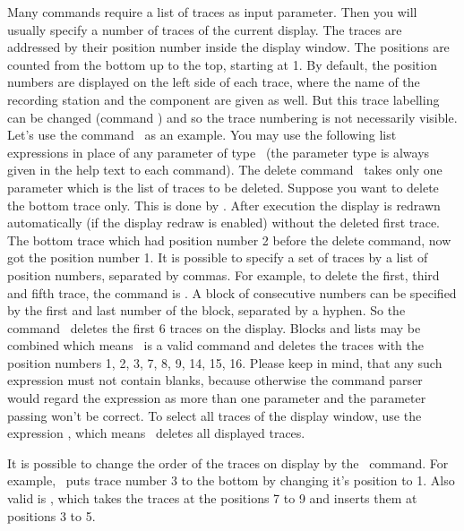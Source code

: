 Many commands require a list of traces as input parameter.  Then
you will usually specify a number of traces of the current display.
The traces are addressed by their position number inside the
display window.  The positions are counted from the bottom up to
the top, starting at 1.  By default, the position numbers are
displayed on the left side of each trace, where the name of the
recording station and the component are given as well.  But this
trace labelling can be changed (command ) and so the
trace numbering is not necessarily visible.  Let's use the
command \ as an example.  You may use the following
list expressions in place of any parameter of type \
(the parameter type is always given in the help text to each
command).  The delete command \ takes only one parameter
which is the list of traces to be deleted.  Suppose you want to
delete the bottom trace only.  This is done by .  After
execution the display is redrawn automatically (if the display
redraw is enabled) without the deleted first trace.  The bottom
trace which had position number 2 before the delete command, now
got the position number 1.  It is possible to specify a set of
traces by a list of position numbers, separated by commas.  For
example, to delete the first, third and fifth trace, the command
is \cmd{del 1,3,5}.  A block of consecutive numbers can be specified
by the first and last number of the block, separated by a hyphen.
So the command \cmd{del 1-6}\ deletes the first 6 traces on the
display.  Blocks and lists may be combined which means \ is a valid command and deletes the traces with
the position numbers 1, 2, 3, 7, 8, 9, 14, 15, 16.  Please keep
in mind, that any such expression must not contain blanks, because
otherwise the command parser would regard the expression as more
than one parameter and the parameter passing won't be correct.
To select all traces of the display window, use the expression
, which means \ deletes all displayed traces.

It is possible to change the order of the traces on display by
the \ command.  For example, \ puts
trace number 3 to the bottom by changing it's position to 1.
Also valid is , which takes the traces at the
positions 7 to 9 and inserts them at positions 3 to 5.

